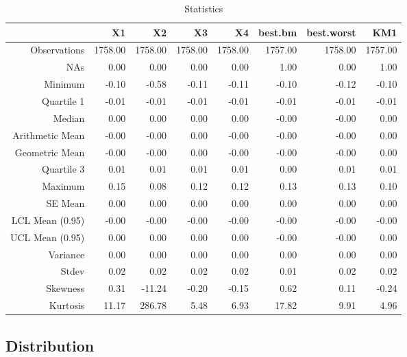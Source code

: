 \documentclass{article}
\begin{document}
\begin{table}[ht]
\begin{center}
\caption{Statistics}
\begin{tabular}{rrrrrrrr}
  \hline
 & X1 & X2 & X3 & X4 & best.bm & best.worst & KM1 \\ 
  \hline
Observations & 1758.00 & 1758.00 & 1758.00 & 1758.00 & 1757.00 & 1758.00 & 1757.00 \\ 
  NAs & 0.00 & 0.00 & 0.00 & 0.00 & 1.00 & 0.00 & 1.00 \\ 
  Minimum & -0.10 & -0.58 & -0.11 & -0.11 & -0.10 & -0.12 & -0.10 \\ 
  Quartile 1 & -0.01 & -0.01 & -0.01 & -0.01 & -0.01 & -0.01 & -0.01 \\ 
  Median & 0.00 & 0.00 & 0.00 & 0.00 & -0.00 & -0.00 & 0.00 \\ 
  Arithmetic Mean & -0.00 & -0.00 & 0.00 & -0.00 & -0.00 & -0.00 & 0.00 \\ 
  Geometric Mean & -0.00 & -0.00 & 0.00 & -0.00 & -0.00 & -0.00 & 0.00 \\ 
  Quartile 3 & 0.01 & 0.01 & 0.01 & 0.01 & 0.00 & 0.01 & 0.01 \\ 
  Maximum & 0.15 & 0.08 & 0.12 & 0.12 & 0.13 & 0.13 & 0.10 \\ 
  SE Mean & 0.00 & 0.00 & 0.00 & 0.00 & 0.00 & 0.00 & 0.00 \\ 
  LCL Mean (0.95) & -0.00 & -0.00 & -0.00 & -0.00 & -0.00 & -0.00 & -0.00 \\ 
  UCL Mean (0.95) & 0.00 & 0.00 & 0.00 & 0.00 & -0.00 & -0.00 & 0.00 \\ 
  Variance & 0.00 & 0.00 & 0.00 & 0.00 & 0.00 & 0.00 & 0.00 \\ 
  Stdev & 0.02 & 0.02 & 0.02 & 0.02 & 0.01 & 0.02 & 0.02 \\ 
  Skewness & 0.31 & -11.24 & -0.20 & -0.15 & 0.62 & 0.11 & -0.24 \\ 
  Kurtosis & 11.17 & 286.78 & 5.48 & 6.93 & 17.82 & 9.91 & 4.96 \\ 
   \hline
\end{tabular}
\end{center}
\end{table}
\subsection{Distribution}
\end{document}
